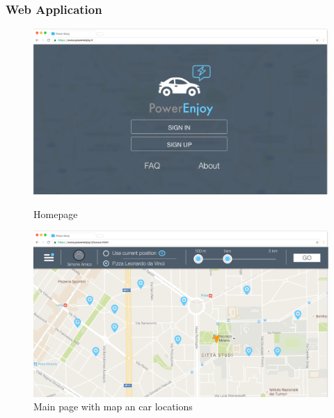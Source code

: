 \documentclass[12pt]{article}
\begin{document}
 	 	\subsubsection{Web Application}
 	  	\begin{figure}
		\centering	
		\vspace{-14cm}		 
		 \includegraphics[scale=0.28]{Images/webApp/Homepage.png}
		 \caption{Homepage}
		 \centering
 	 	  \includegraphics[scale=0.28]{Images/webApp/MainSearch.png}
		  \caption{Main page with map an car locations}
 	 	\end{figure}
 	 	\clearpage
 	 	
\end{document}
